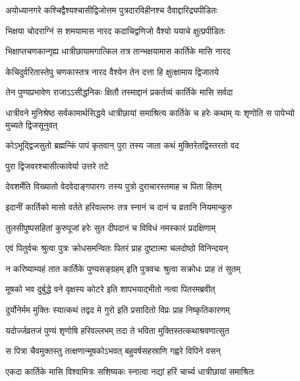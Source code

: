\twolineshloka
{अयोध्यानगरे कश्चिद्वैश्यश्चासीद्विजोत्तम}
{पुत्रदारविहीनश्च दैवाद्दारिद्र्यपीडितः} %

\twolineshloka
{भिक्षया चोदराग्निं स शमयामास नारद}
{कदाचिद्वणिजो वैश्यो ययाचे क्षुत्प्रपीडितः} %

\twolineshloka
{भिक्षाप्तचणकान्गृह्य धात्रीछायामगात्किल}
{तत्र तान्भक्षयामास कार्तिके मासि नारद} %

\twolineshloka
{केचिदुर्वरितास्तेपु चणकास्तत्र नारद}
{वैश्येन तेन दत्ता हि क्षुत्क्षामाय द्विजातये} %

\twolineshloka
{तेन पुण्यप्रभावेण राजाऽऽसीद्धनिकः क्षितौ}
{तस्माद्दानं प्रकर्तव्यं कार्तिके मासि सर्वदा} %

\threelineshloka
{धात्रीवने मुनिश्रेष्ठ सर्वकामार्थसिद्धये}
{धात्रीछायां समाश्रित्य कार्तिके च हरेः कथाम्}
{यः शृणोति स पापेभ्यो मुच्यते द्विजसूनुवत्} %

\twolineshloka
{कोऽभूद्द्विजसुतो ब्रह्मन्किं पापं कृतवान् पुरा}
{तस्य जाता कथं मुक्तिरेतद्विस्तरतो वद} %



\onelineshloka
{पुरा द्विजवरश्चासीत्कावेर्या उत्तरे तटे} %

\twolineshloka
{देवशर्मेति विख्यातो वेदवेदाङ्गपारगः}
{तस्य पुत्रो दुराचारस्तमाह च पिता हितम्} %

\twolineshloka
{इदानीं कार्तिको मासो वर्तते हरिवल्लभः}
{तत्र स्नानं च दानं च व्रतानि नियमान्कुरु} %

\twolineshloka
{तुलसीपुष्पसहितां कुरुपूजां हरेः सुत}
{दीपदानं च विविधं नमस्कारं प्रदक्षिणाम्} %

\twolineshloka
{एवं पितुर्वचः श्रुत्वा पुत्रः क्रोधसमन्वितः}
{पितरं प्राह दुष्टात्मा चलदोष्ठो विनिन्दयन्} %


\twolineshloka
{न करिष्याम्यहं तात कार्तिके पुण्यसङ्ग्रहम्}
{इति पुत्रवचः श्रुत्वा सक्रोधः प्राह तं सुतम्} %

\twolineshloka
{मूषको भव दुर्बुद्धे वने वृक्षस्य कोटरे}
{इति शापभयाद्भीतो नत्वा पितरमब्रवीत्} %

\twolineshloka
{दुर्योनेर्मम मुक्तिः स्यात्कथं तद्वद मे गुरो}
{इति प्रसादितो विप्रः प्राह निष्कृतिकारणम्} %

\twolineshloka
{यदोर्ज्जव्रतजं पुण्यं शृणोषि हरिवल्लभम्}
{तदा ते भविता मुक्तिस्तत्कथाश्रवणात्सुत} %

\twolineshloka
{स पित्रा चैवमुक्तस्तु तत्क्षणान्मूषकोऽभवत्}
{बहुवर्षसहस्राणि गह्वरे विपिने वसन्} %

\twolineshloka
{एकदा कार्तिके मासि विश्वामित्रः सशिष्यकः}
{स्नात्वा नद्यां हरिं चार्च्य धात्रीछायां समाश्रितः} %

